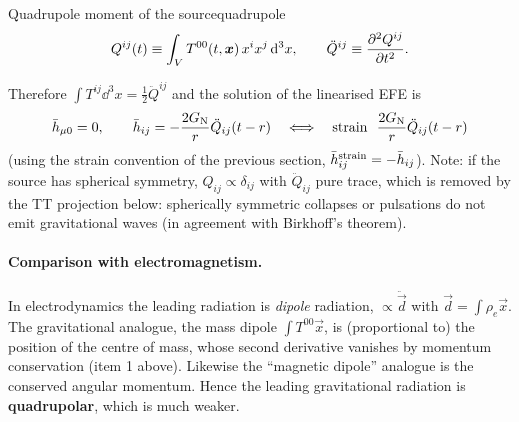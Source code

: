\begin{definition}{Quadrupole moment of the source}{quadrupole}
\begin{equation}
  Q^{ij}(t)\equiv\int_VT^{00}(t,\bm{x})\,x^ix^j\,\mathrm{d}^3x ,\qquad\ddot Q^{ij}\equiv\frac{\partial^2Q^{ij}}{\partial t^2}.
\end{equation}
\end{definition}
Therefore $\int T^{ij}\dd^3x=\frac12\ddot Q^{ij}$ and the solution of the linearised EFE is
\begin{equation}
  \bar h_{\mu0}=0,\qquad\bar h_{ij}=-\frac{2\GN}{r}\ddot Q_{ij}(t-r)\quad\Longleftrightarrow\quad\text{strain}\ \ \frac{2\GN}{r}\ddot Q_{ij}(t-r)
\end{equation}
(using the strain convention of the previous section, $\bar h^{\rm strain}_{ij}=-\bar h_{ij}$). Note: if the source has spherical symmetry, $Q_{ij}\propto\delta_{ij}$ with $\ddot Q_{ij}$ pure trace, which is removed by the TT projection below: spherically symmetric collapses or pulsations do not emit gravitational waves (in agreement with Birkhoff's theorem).

\paragraph{Comparison with electromagnetism.} In electrodynamics the leading radiation is \emph{dipole} radiation, $\propto\ddot{\vec d}$ with $\vec d=\int\rho_e\vec x$. The gravitational analogue, the mass dipole $\int T^{00}\vec x$, is (proportional to) the position of the centre of mass, whose second derivative vanishes by momentum conservation (item 1 above). Likewise the ``magnetic dipole'' analogue is the conserved angular momentum. Hence the leading gravitational radiation is \textbf{quadrupolar}, which is much weaker.


